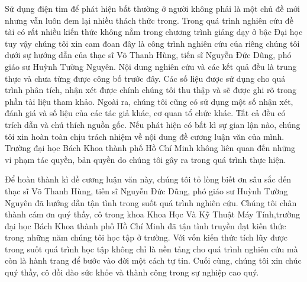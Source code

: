 \documentclass[12pt,a4paper,oneside]{book} %
\begin{document}

\coverpage

\frontmatter

\begin{declaration}
    Sử dụng điện tim để phát hiện bất thường ở người không phải là một chủ đề mới nhưng vẫn luôn đem lại nhiều thách thức trong. Trong quá trình nghiên cứu đề tài có rất nhiều kiến thức không nằm trong chương trình giảng dạy ở bậc Đại học tuy vậy chúng tôi xin cam đoan đây là công trình nghiên cứu của riêng chúng tôi dưới sự hướng dẫn của thạc sĩ Võ Thanh Hùng, tiến sĩ Nguyễn Đức Dũng, phó giáo sư Huỳnh Tường Nguyên. Nội dung nghiên cứu và các kết quả đều là trung thực và chưa từng được công bố trước đây. Các số liệu được sử dụng cho quá trình phân tích, nhận xét được chính chúng tôi thu thập và sẽ được ghi rõ trong phần tài liệu tham khảo. Ngoài ra, chúng tôi cũng có sử dụng một số nhận xét, đánh giá và số liệu của các tác giả khác, cơ quan tổ chức khác. Tất cả đều có trích dẫn và chú thích nguồn gốc. Nếu phát hiện có bất kì sự gian lận nào, chúng tôi xin hoàn toàn chịu trách nhiệm về nội dung đề cương luận văn của mình. Trường đại học Bách Khoa thành phố Hồ Chí Minh không liên quan đến những vi phạm tác quyền, bản quyền do chúng tôi gây ra trong quá trình thực hiện.
 \end{declaration}

\begin{acknowledgments}
	Để hoàn thành kì đề cương luận văn này, chúng tôi tỏ lòng biết ơn sâu sắc đến thạc sĩ Võ Thanh Hùng, tiến sĩ Nguyễn Đức Dũng, phó giáo sư Huỳnh Tường Nguyên đã hướng dẫn tận tình trong suốt quá trình nghiên cứu. 
	Chúng tôi chân thành cám ơn quý thầy, cô trong khoa Khoa Học Và Kỹ Thuật Máy Tính,trường đại học Bách Khoa thành phố Hồ Chí Minh đã tận tình truyền đạt kiến thức trong những năm chúng tôi học tập ở trường. Với vốn kiến thức tích lũy được trong suốt quá trình học tập không chỉ là nền tảng cho quá trình nghiên cứu mà còn là hành trang để bước vào đời một cách tự tin. 
	Cuối cùng, chúng tôi xin chúc quý thầy, cô dồi dào sức khỏe và thành công trong sự nghiệp cao quý.
\end{acknowledgments}
\end{document}
